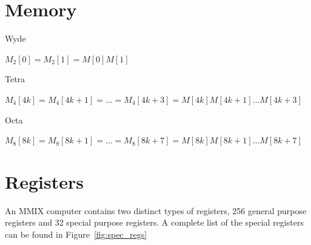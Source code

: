 \documentclass[a4paper,11pt]{report}
\begin{document}
\section{Memory}
Wyde

\begin{math}
M_2[0] = M_2[1] = M[0]M[1]
\end{math}

Tetra

\begin{math}
M_4[4k] = M_4[4k+1] = ... = M_4[4k+3] = M[4k]M[4k+1]...M[4k+3]
\end{math}

Octa

\begin{math}
M_8[8k] = M_8[8k+1] = ... = M_8[8k+7] = M[8k]M[8k+1]...M[8k+7]
\end{math}

\section{Registers}
An MMIX computer contains two distinct types of registers, 256 general purpose registers and 32 special purpose registers. A complete list of the special registers can be found in Figure~\ref{fig:spec_regs}
\end{document}
